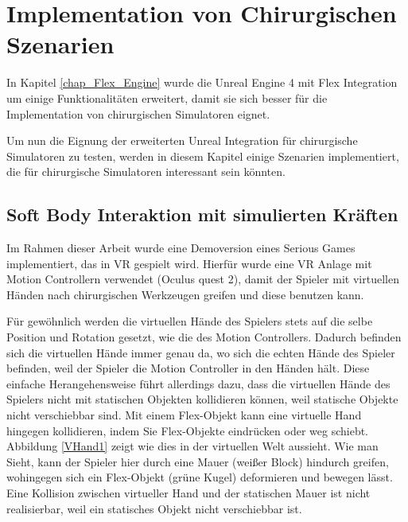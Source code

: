 \chapter{Implementation von Chirurgischen Szenarien}
\label{chap_Szenarien}

In Kapitel \ref{chap_Flex_Engine} wurde die Unreal Engine 4 mit Flex Integration um einige Funktionalitäten erweitert, damit sie sich besser für die Implementation von chirurgischen Simulatoren eignet. 

Um nun die Eignung der erweiterten Unreal Integration für chirurgische Simulatoren zu testen, werden in diesem Kapitel einige Szenarien implementiert, die für chirurgische Simulatoren interessant sein könnten.


\section{Soft Body Interaktion mit simulierten Kräften}
\label{sec_FSystem}

Im Rahmen dieser Arbeit wurde eine Demoversion eines Serious Games implementiert, das in VR gespielt wird. Hierfür wurde eine VR Anlage mit Motion Controllern verwendet (Oculus quest 2), damit der Spieler mit virtuellen Händen nach chirurgischen Werkzeugen greifen und diese benutzen kann.

Für gewöhnlich werden die virtuellen Hände des Spielers stets auf die selbe Position und Rotation gesetzt, wie die des Motion Controllers. Dadurch befinden sich die virtuellen Hände immer genau da, wo sich die echten Hände des Spieler befinden, weil der Spieler die Motion Controller in den Händen hält.
Diese einfache Herangehensweise führt allerdings dazu, dass die virtuellen Hände des Spielers nicht mit statischen Objekten kollidieren können, weil statische Objekte nicht verschiebbar sind. Mit einem Flex-Objekt kann eine virtuelle Hand hingegen kollidieren, indem Sie Flex-Objekte eindrücken oder weg schiebt. Abbildung \ref{VHand1} zeigt wie dies in der virtuellen Welt aussieht. Wie man Sieht, kann der Spieler hier durch eine Mauer (weißer Block) hindurch greifen, wohingegen sich ein Flex-Objekt (grüne Kugel) deformieren und bewegen lässt. Eine Kollision zwischen virtueller Hand und der statischen Mauer ist nicht realisierbar, weil ein statisches Objekt nicht verschiebbar ist.

